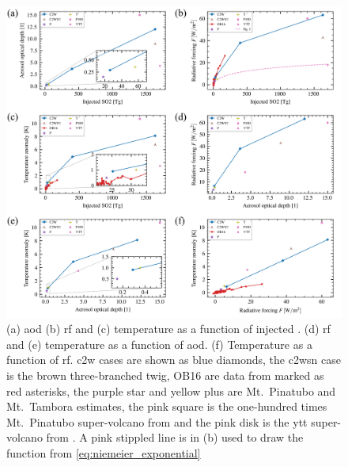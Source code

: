 \documentclass[twocol]{ametsocV6.1}
\newcommand{\iso}[1][i]{{#1}njected \ce{SO2}}
\begin{document}
\begin{figure}
  \centering
  \includegraphics[width=0.95\linewidth]{figures/parameter_scan.png}

  \caption{(a) \gls{aod} (b) \gls{rf} and (c) temperature as a function of \iso{}\@. (d)
    \gls{rf} and (e) temperature as a function of \gls{aod}. (f) Temperature as a function
    of \gls{rf}. \gls{c2w} cases are shown as blue diamonds, the \gls{c2wsn} case is the
    brown three-branched twig, OB16 are data from \citet{ottobliesner2016} marked as red
    asterisks, the purple star and yellow plus are Mt.\ Pinatubo and Mt.\ Tambora estimates,
    the pink square is the one-hundred times Mt.\ Pinatubo super-volcano from
    \citet{jones2005} and the pink disk is the \gls{ytt} super-volcano from
    \citet{timmreck2010}. A pink stippled line is in (b) used to draw the function from
    \ref{eq:niemeier_exponential}}\label{fig:parameter_scan}%
\end{figure}
\end{document}
